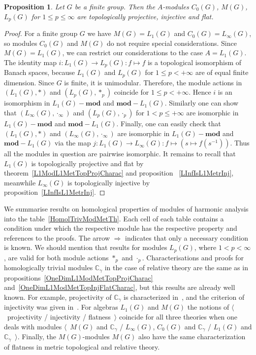 \documentclass{article}
\theoremstyle{plain}
\newtheorem{proposition}{Proposition}[section]
\theoremstyle{definition}
\newtheorem{proof}{Proof}\def\theproof{}
\newcommand{\convol}{\ast}
\begin{document}
\begin{fulltext}
\begin{proposition}\label{StdModFinGrL1MGTopInjProjFlatCharac} Let $G$ be a
finite group. Then the $A$-modules $C_0(G)$, $M(G)$, $L_p(G)$ for $1\leq p\leq
\infty$ are topologically projective, injective and flat.
\end{proposition} 
\begin{proof}
For a finite group $G$ we have $M(G)=L_1(G)$ and $C_0(G)=L_\infty(G)$, so
modules $C_0(G)$ and $M(G)$ do not require special considerations. Since
$M(G)=L_1(G)$, we can restrict our considerations to the case $A=L_1(G)$. The
identity map $i:L_1(G)\to L_p(G):f\mapsto f$ is a topological isomorphism of
Banach spaces, because $L_1(G)$ and $L_p(G)$ for $1\leq p<+\infty$ are of equal
finite dimension. Since $G$ is finite, it is unimodular. Therefore, the module
actions in $(L_1(G),\convol)$ and $(L_p(G),\convol_p)$ coincide for $1\leq
p<+\infty$. Hence $i$ is an isomorphism in $L_1(G)-\mathbf{mod}$ and
$\mathbf{mod}-L_1(G)$. Similarly one can show that $(L_\infty(G),\cdot_\infty)$
and $(L_p(G),\cdot_p)$ for $1<p\leq+\infty$ are isomorphic in
$L_1(G)-\mathbf{mod}$ and $\mathbf{mod}-L_1(G)$. Finally, one can easily check
that $(L_1(G),\convol)$ and $(L_\infty(G),\cdot_\infty)$ are isomorphic in
$L_1(G)-\mathbf{mod}$ and $\mathbf{mod}-L_1(G)$ via the map $j:L_1(G)\to
L_\infty(G):f\mapsto(s\mapsto f(s^{-1}))$. Thus all the modules in question are
pairwise isomorphic. It remains to recall that $L_1(G)$ is topologically
projective and flat by theorem~\ref{L1ModL1MetTopProjCharac} and proposition
~\ref{LInfIsL1MetrInj}, meanwhile $L_\infty(G)$ is topologically injective by
proposition~\ref{LInfIsL1MetrInj}.
\end{proof}

We summarise results on homological properties of modules of harmonic analysis
into the table~\ref{HomolTrivModMetTh}. Each cell of each table contains a
condition under which the respective module has the respective property and
references to the proofs. The arrow $\Longrightarrow$ indicates that only a
necessary condition is known. We should mention that results for modules
$L_p(G)$, where $1<p<\infty$, are valid for both module actions $\convol_p$ and
$\cdot_p$. Characterisations and proofs for homologically trivial modules
$\mathbb{C}_\gamma$ in the case of relative theory are the same as in
propositions~\ref{OneDimL1ModMetTopProjCharac}
and~\ref{OneDimL1ModMetTopInjFlatCharac}, but this results are already well
known. For example, projectivity of $\mathbb{C}_\gamma$ is characterized
in~\cite[theorem IV.5.13]{HelBanLocConvAlg}, and the criterion of injectivity
was given in~\cite[theorem 2.5]{JohnCohomolBanAlg}. For algebras $L_1(G)$ and
$M(G)$ the notions of $\langle$~projectivity / injectivity / flatness~$\rangle$
coincide for all three theories when one deals with modules $\langle$~$M(G)$ and
$\mathbb{C}_\gamma$ / $L_\infty(G)$, $C_0(G)$ and $\mathbb{C}_\gamma$ / $L_1(G)$
and $\mathbb{C}_\gamma$~$\rangle$. Finally, the $M(G)$-modules $M(G)$ also have
the same characterization of flatness in metric topological and relative theory.


\end{fulltext}
\end{document}

